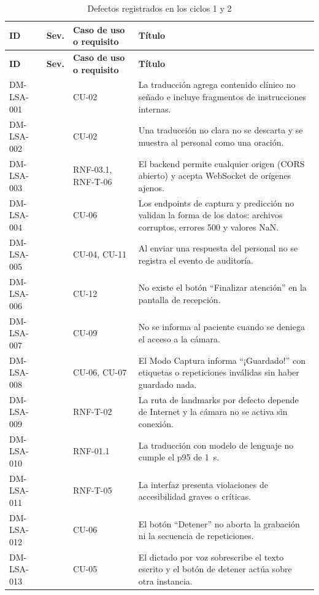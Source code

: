 \begin{longtable}{>{\raggedright\arraybackslash}p{2.2cm} >{\centering\arraybackslash}p{1.0cm} >{\raggedright\arraybackslash}p{2.4cm} >{\raggedright\arraybackslash}p{8.7cm}}
  \caption{Defectos registrados en los ciclos 1 y 2}\label{tab:defectos}\\
  \toprule
  \textbf{ID} & \textbf{Sev.} & \textbf{Caso de uso o requisito} & \textbf{Título} \\
  \midrule
  \endfirsthead
  \toprule
  \textbf{ID} & \textbf{Sev.} & \textbf{Caso de uso o requisito} & \textbf{Título} \\
  \midrule
  \endhead
  DM-LSA-001 & 1 & CU-02 & La traducción agrega contenido clínico no señado e incluye fragmentos de instrucciones internas. \\
  DM-LSA-002 & 2 & CU-02 & Una traducción no clara no se descarta y se muestra al personal como una oración. \\
  DM-LSA-003 & 2 & RNF-03.1, RNF-T-06 & El backend permite cualquier origen (CORS abierto) y acepta WebSocket de orígenes ajenos. \\
  DM-LSA-004 & 2 & CU-06 & Los endpoints de captura y predicción no validan la forma de los datos: archivos corruptos, errores 500 y valores NaN. \\
  DM-LSA-005 & 2 & CU-04, CU-11 & Al enviar una respuesta del personal no se registra el evento de auditoría. \\
  DM-LSA-006 & 2 & CU-12 & No existe el botón ``Finalizar atención'' en la pantalla de recepción. \\
  DM-LSA-007 & 2 & CU-09 & No se informa al paciente cuando se deniega el acceso a la cámara. \\
  DM-LSA-008 & 2 & CU-06, CU-07 & El Modo Captura informa ``¡Guardado!'' con etiquetas o repeticiones inválidas sin haber guardado nada. \\
  DM-LSA-009 & 2 & RNF-T-02 & La ruta de landmarks por defecto depende de Internet y la cámara no se activa sin conexión. \\
  DM-LSA-010 & 2 & RNF-01.1 & La traducción con modelo de lenguaje no cumple el p95 de 1~s. \\
  DM-LSA-011 & 2 & RNF-T-05 & La interfaz presenta violaciones de accesibilidad graves o críticas. \\
  DM-LSA-012 & 3 & CU-06 & El botón ``Detener'' no aborta la grabación ni la secuencia de repeticiones. \\
  DM-LSA-013 & 3 & CU-05 & El dictado por voz sobrescribe el texto escrito y el botón de detener actúa sobre otra instancia. \\

\end{longtable}
